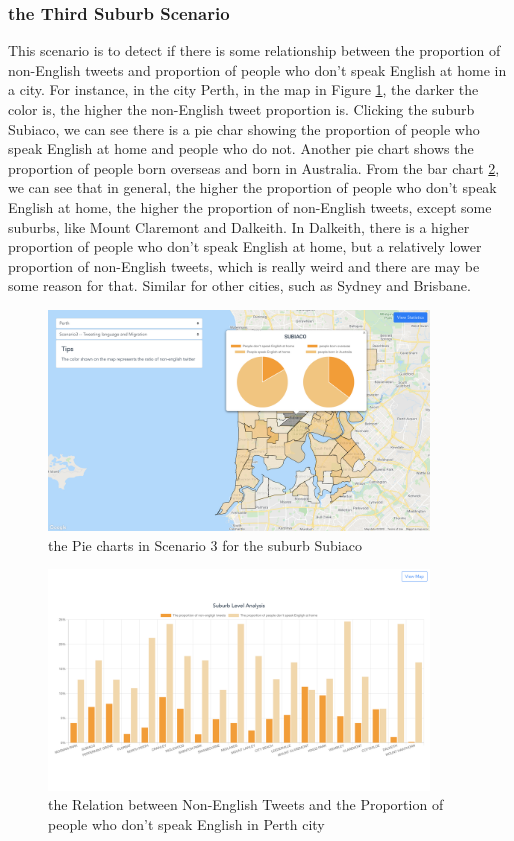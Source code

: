 \documentclass{article}
\begin{document}
\subsubsection{the Third Suburb Scenario}

This scenario is to detect if there is some relationship between the proportion  of non-English tweets and proportion of people who don't speak English at home in a city. For instance, in the city Perth, in the map in Figure 
\ref{fig:Perth_pie_chart}, the darker the color is, the higher the non-English tweet proportion is. Clicking the suburb Subiaco, we can see there is a pie char showing the proportion of people who speak English at home and people who do not. Another pie chart shows the proportion of people born overseas and born in Australia. From the bar chart
\ref{fig:Perth_histogram}, we can see that in general, the higher the proportion of people who don’t speak English at home, the higher the proportion of non-English tweets, except some suburbs, like Mount Claremont and Dalkeith. In Dalkeith, there is a higher proportion of people who don’t speak English at home, but a relatively lower proportion of non-English tweets, which is really weird and there are may be some reason for that. Similar for other cities, such as Sydney and Brisbane.

\begin{figure}[htp]
\centering
\includegraphics[width=0.9\textwidth]{img/Perth_pie_chart.jpg}
\caption{the Pie charts in Scenario 3 for the suburb Subiaco}
\label{fig:Perth_pie_chart}
\end{figure}

\begin{figure}[htp]
\centering
\includegraphics[width=0.9\textwidth]{img/Perth_histogram.jpg}
\caption{the Relation between Non-English Tweets and the Proportion of people who don't speak English in Perth city}
\label{fig:Perth_histogram}
\end{figure}
\end{document}
